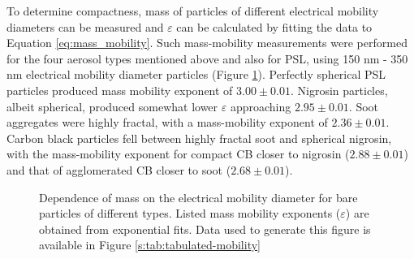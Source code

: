 To determine compactness, mass of particles of different electrical mobility diameters can be measured and $\varepsilon$ can be calculated by fitting the data to Equation \ref{eq:mass_mobility}. Such mass-mobility measurements were performed for the four aerosol types mentioned above and also for PSL, using 150 nm - 350 nm electrical mobility diameter particles (Figure \ref{fig:mass_mobility}). Perfectly spherical PSL particles produced mass mobility exponent of $3.00\pm 0.01$. Nigrosin particles, albeit spherical, produced  somewhat lower $\varepsilon$ approaching $2.95\pm 0.01$. Soot aggregates were highly fractal, with a mass-mobility exponent of $2.36\pm 0.01$. Carbon black particles fell between highly fractal soot and spherical nigrosin, with the mass-mobility exponent for compact CB closer to nigrosin ($2.88\pm 0.01$) and that of agglomerated CB closer to soot ($2.68\pm 0.01$).

\begin{figure}[htp]
    \centering
    \caption{Dependence of mass on the electrical mobility diameter for bare particles of different types. Listed mass mobility exponents ($\varepsilon$) are obtained from exponential fits. Data used to generate this figure is available in Figure \ref{s:tab:tabulated-mobility}}
    \label{fig:mass_mobility}
\end{figure}

